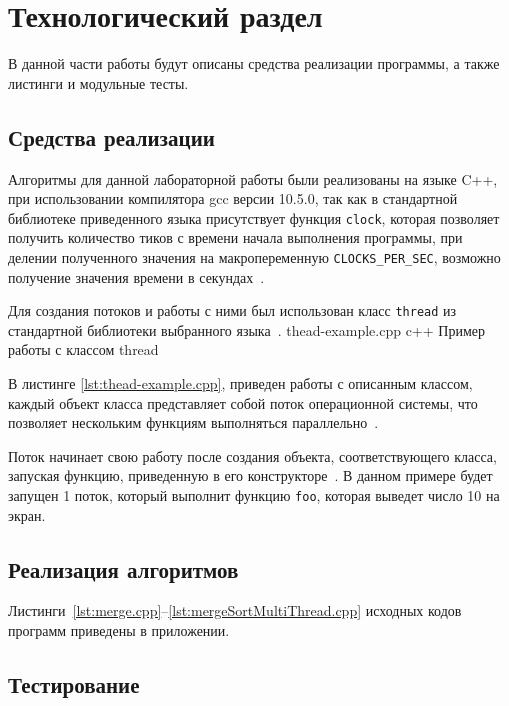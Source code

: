 \chapter{Технологический раздел}

В данной части работы будут описаны средства реализации программы, а также листинги и  модульные  тесты.



	
\section{Средства реализации}
Алгоритмы для данной лабораторной работы были реализованы на языке C++, при использовании компилятора gcc версии 10.5.0, так как в стандартной библиотеке приведенного языка
присутствует функция \texttt{clock}, которая  позволяет получить количество тиков с времени начала выполнения программы, при делении полученного значения на макропеременную \texttt{CLOCKS\_PER\_SEC}, возможно получение значения времени в секундах~\cite{cpp-time}.

Для создания потоков и работы с ними был использован класс \texttt{thread} из стандартной библиотеки выбранного языка~\cite{std-thread}.
{thead-example.cpp} %
{c++} %
{Пример работы с классом thread} %

В листинге \ref{lst:thead-example.cpp}, приведен работы с описанным классом, каждый объект класса представляет собой поток операционной системы, что позволяет нескольким функциям выполняться параллельно~\cite{std-thread}. 

Поток начинает свою работу после создания объекта, соответствующего класса, запуская функцию, приведенную в его конструкторе~\cite{std-thread}.
В данном примере будет запущен 1 поток, который выполнит функцию \texttt{foo},
которая выведет число 10 на экран.


\section{Реализация алгоритмов}
Листинги~\ref{lst:merge.cpp}--\ref{lst:mergeSortMultiThread.cpp} исходных кодов программ приведены в приложении. 

\section{Тестирование}


